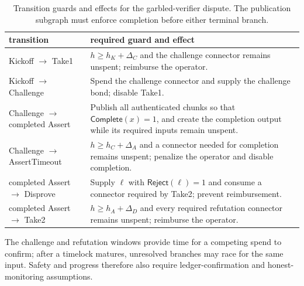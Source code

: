 \documentclass[11pt]{article}
\begin{document}
\begin{table}[t]\centering\small
\begin{tabularx}{\textwidth}{lX}\toprule
transition & required guard and effect\\\midrule
Kickoff $\to$ Take1 & $h\ge h_K+\Delta_C$ and the challenge connector remains
unspent; reimburse the operator.\\
Kickoff $\to$ Challenge & Spend the challenge connector and supply the
challenge bond; disable Take1.\\
Challenge $\to$ completed Assert & Publish all authenticated chunks so that
$\mathsf{Complete}(x)=1$, and create the completion output while its
required inputs remain unspent.\\
Challenge $\to$ AssertTimeout & $h\ge h_C+\Delta_A$ and a connector needed
for completion remains unspent; penalize the operator and disable completion.\\
completed Assert $\to$ Disprove & Supply $\ell$ with
$\mathsf{Reject}(\ell)=1$ and consume a connector required by Take2;
prevent reimbursement.\\
completed Assert $\to$ Take2 & $h\ge h_A+\Delta_D$ and every required
refutation connector remains unspent; reimburse the operator.\\\bottomrule
\end{tabularx}
\caption{Transition guards and effects for the garbled-verifier dispute. The
publication subgraph must enforce completion before either terminal branch.}
\label{tab:graph_transitions}
\end{table}

The challenge and refutation windows provide time for a competing spend to
confirm; after a timelock matures, unresolved branches may race for the
same input. Safety and progress therefore also require ledger-confirmation
and honest-monitoring assumptions.
\end{document}
